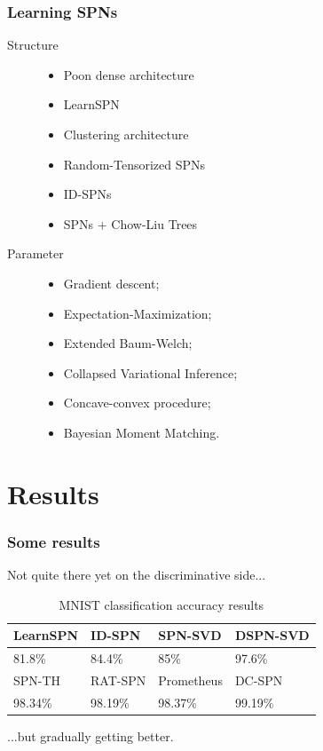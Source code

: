 \documentclass[pdf]{beamer}
\begin{document}
\begin{frame}
  \frametitle{Learning SPNs}

  \begin{description}
    \item[Structure]
      \begin{itemize}
        \item Poon dense architecture\nocite{poon-domingos}
        \item LearnSPN\nocite{gens-domingos}
        \item Clustering architecture\nocite{clustering}
        \item Random-Tensorized SPNs\nocite{deep-learn-spn}
        \item ID-SPNs\nocite{id-spn}
        \item SPNs + Chow-Liu Trees\nocite{vergari-mauro}
      \end{itemize}
    \item[Parameter]
      \begin{itemize}
        \item Gradient descent;\nocite{poon-domingos,diff-approach-darwiche}
        \item Expectation-Maximization;\nocite{discriminative}
        \item Extended Baum-Welch;\nocite{baum-welch}
        \item Collapsed Variational Inference;\nocite{variational-spn}
        \item Concave-convex procedure;\nocite{cccp}
        \item Bayesian Moment Matching.\nocite{bayesian-moment}
      \end{itemize}
  \end{description}
\end{frame}

\section{Results}

\begin{frame}
  \frametitle{Some results}

  Not quite there yet on the discriminative side...

  \begin{table}
    \caption*{MNIST classification accuracy results}
    \begin{tabular}{l|l|l|l}
      LearnSPN & ID-SPN & SPN-SVD & DSPN-SVD\\
      \hline
      \vspace{0.5cm}
      81.8\% & 84.4\% & 85\% & 97.6\%\\
      SPN-TH & RAT-SPN & Prometheus & DC-SPN\\
      \hline
      98.34\% & 98.19\% & 98.37\% & 99.19\%
    \end{tabular}
  \end{table}
  \vspace{0.5cm}

  ...but gradually getting better.
\end{frame}
\end{document}
